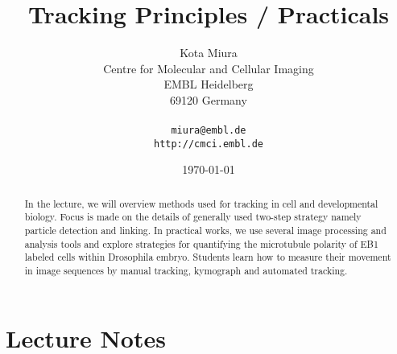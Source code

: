 \documentclass[11pnt]{article}
\begin{document}
\author{Kota Miura\\
  Centre for Molecular and Cellular Imaging\\
  EMBL Heidelberg\\
  69120  Germany\\
  \\
  \texttt{miura@embl.de}\\
  \texttt{http://cmci.embl.de}}
\date{\today}
\title{Tracking Principles / Practicals}
\maketitle

\begin{abstract}
In the lecture, we will overview methods used for tracking in cell and developmental biology. Focus is made on the details of generally used two-step strategy namely particle detection and linking. In practical works, we use several image processing and analysis tools and explore strategies for quantifying the microtubule polarity of EB1 labeled cells within Drosophila embryo. Students learn how to measure their movement in image sequences by manual tracking, kymograph and automated tracking. 
\end{abstract}

\section{Lecture Notes}
\end{document}
